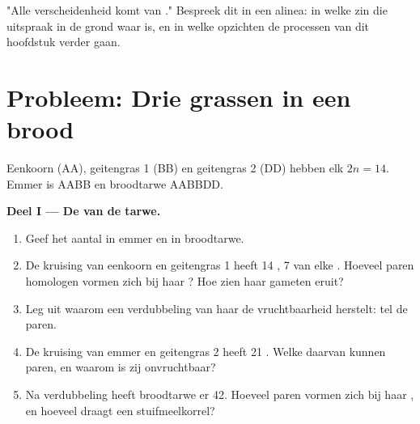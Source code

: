 \begin{exercise}[$\star\star\star$]\label{exo:g12:diversification-of-life:15}
"Alle verscheidenheid komt van ." Bespreek dit in een alinea: in
welke zin die uitspraak in de grond waar is, en in welke opzichten de
processen van dit hoofdstuk verder gaan.
\end{exercise}

\section{Probleem: Drie grassen in een brood}

\begin{problem}
\label{pb:g12:diversification-of-life:1}
Eenkoorn (AA), geitengras 1 (BB) en geitengras 2 (DD) hebben elk
$2n = 14$. Emmer is AABB en broodtarwe AABBDD.

\medskip
\noindent\textbf{Deel I --- De  van de tarwe.}
\begin{enumerate}
  \item Geef het aantal  in emmer en in broodtarwe.
  \item De kruising van eenkoorn en geitengras 1 heeft 14 , 7
        van elke . Hoeveel paren homologen vormen zich bij haar
        ? Hoe zien haar gameten eruit?
  \item Leg uit waarom een verdubbeling van haar  de
        vruchtbaarheid herstelt: tel de paren.
  \item De kruising van emmer en geitengras 2 heeft 21 . Welke
        daarvan kunnen paren, en waarom is zij onvruchtbaar?
  \item Na verdubbeling heeft broodtarwe er 42. Hoeveel paren vormen zich
        bij haar , en hoeveel  draagt een stuifmeelkorrel?
\end{enumerate}


\end{problem}
